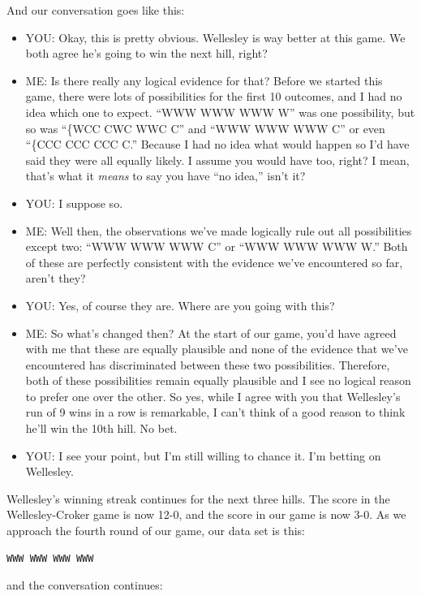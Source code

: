 \documentclass[
]{book}
\providecommand{\tightlist}{%
  \setlength{\itemsep}{0pt}\setlength{\parskip}{0pt}}
\begin{document}
And our conversation goes like this:

\begin{itemize}
\tightlist
\item
  YOU: Okay, this is pretty obvious. Wellesley is way better at this game. We both agree he's going to win the next hill, right?
\item
  ME: Is there really any logical evidence for that? Before we started this game, there were lots of possibilities for the first 10 outcomes, and I had no idea which one to expect. ``WWW WWW WWW W'' was one possibility, but so was ``\{WCC CWC WWC C'' and ``WWW WWW WWW C'' or even ``\{CCC CCC CCC C.'' Because I had no idea what would happen so I'd have said they were all equally likely. I assume you would have too, right? I mean, that's what it \emph{means} to say you have ``no idea,'' isn't it?
\item
  YOU: I suppose so.
\item
  ME: Well then, the observations we've made logically rule out all possibilities except two: ``WWW WWW WWW C'' or ``WWW WWW WWW W.'' Both of these are perfectly consistent with the evidence we've encountered so far, aren't they?\\
\item
  YOU: Yes, of course they are. Where are you going with this?
\item
  ME: So what's changed then? At the start of our game, you'd have agreed with me that these are equally plausible and none of the evidence that we've encountered has discriminated between these two possibilities. Therefore, both of these possibilities remain equally plausible and I see no logical reason to prefer one over the other. So yes, while I agree with you that Wellesley's run of 9 wins in a row is remarkable, I can't think of a good reason to think he'll win the 10th hill. No bet.
\item
  YOU: I see your point, but I'm still willing to chance it. I'm betting on Wellesley.
\end{itemize}

Wellesley's winning streak continues for the next three hills. The score in the Wellesley-Croker game is now 12-0, and the score in our game is now 3-0. As we approach the fourth round of our game, our data set is this:

\begin{verbatim}
WWW WWW WWW WWW
\end{verbatim}

and the conversation continues:
\end{document}
